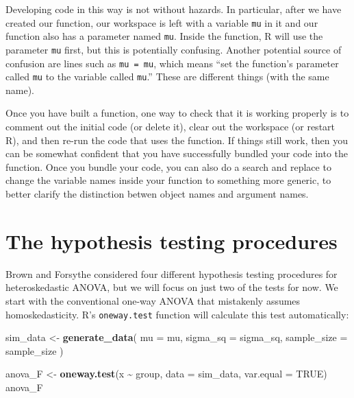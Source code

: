 \documentclass[
]{book}
\newenvironment{Shaded}{\begin{snugshade}}{\end{snugshade}}
\newcommand{\AttributeTok}[1]{\textcolor[rgb]{0.13,0.29,0.53}{#1}}
\newcommand{\ConstantTok}[1]{\textcolor[rgb]{0.56,0.35,0.01}{#1}}
\newcommand{\FunctionTok}[1]{\textcolor[rgb]{0.13,0.29,0.53}{\textbf{#1}}}
\newcommand{\NormalTok}[1]{#1}
\newcommand{\OtherTok}[1]{\textcolor[rgb]{0.56,0.35,0.01}{#1}}
\newcommand{\SpecialCharTok}[1]{\textcolor[rgb]{0.81,0.36,0.00}{\textbf{#1}}}
\begin{document}
Developing code in this way is not without hazards.
In particular, after we have created our function, our workspace is left with a variable \texttt{mu} in it and our function also has a parameter named \texttt{mu}.
Inside the function, R will use the parameter \texttt{mu} first, but this is potentially confusing.
Another potential source of confusion are lines such as \texttt{mu\ =\ mu}, which means ``set the function's parameter called \texttt{mu} to the variable called \texttt{mu}.''
These are different things (with the same name).

Once you have built a function, one way to check that it is working properly is to comment out the initial code (or delete it), clear out the workspace (or restart R), and then re-run the code that uses the function.
If things still work, then you can be somewhat confident that you have successfully bundled your code into the function.
Once you bundle your code, you can also do a search and replace to change the variable names inside your function to something more generic, to better clarify the distinction betwen object names and argument names.

\section{The hypothesis testing procedures}\label{the-hypothesis-testing-procedures}

Brown and Forsythe considered four different hypothesis testing procedures for heteroskedastic ANOVA, but we will focus on just two of the tests for now.
We start with the conventional one-way ANOVA that mistakenly assumes homoskedasticity.
R's \texttt{oneway.test} function will calculate this test automatically:

\begin{Shaded}
\begin{Highlighting}[]
\NormalTok{sim\_data }\OtherTok{\textless{}{-}} \FunctionTok{generate\_data}\NormalTok{(}
  \AttributeTok{mu =}\NormalTok{ mu, }
  \AttributeTok{sigma\_sq =}\NormalTok{ sigma\_sq,}
  \AttributeTok{sample\_size =}\NormalTok{ sample\_size}
\NormalTok{)}

\NormalTok{anova\_F }\OtherTok{\textless{}{-}} \FunctionTok{oneway.test}\NormalTok{(x }\SpecialCharTok{\textasciitilde{}}\NormalTok{ group, }\AttributeTok{data =}\NormalTok{ sim\_data, }\AttributeTok{var.equal =} \ConstantTok{TRUE}\NormalTok{)}
\NormalTok{anova\_F}
\end{Highlighting}
\end{Shaded}
\end{document}
